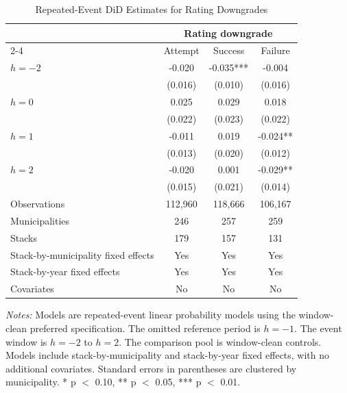 \begin{table}[!htbp]
\centering
\caption{Repeated-Event DiD Estimates for Rating Downgrades}
\label{tab:northeast_did_downgrade}
\small
\begin{tabular}{lccc}
\toprule
 & \multicolumn{3}{c}{Rating downgrade} \\
\cmidrule(lr){2-4}
 & Attempt & Success & Failure \\
\midrule
$h=-2$ & -0.020 & -0.035*** & -0.004 \\
 & (0.016) & (0.010) & (0.016) \\
$h=0$ & 0.025 & 0.029 & 0.018 \\
 & (0.022) & (0.023) & (0.022) \\
$h=1$ & -0.011 & 0.019 & -0.024** \\
 & (0.013) & (0.020) & (0.012) \\
$h=2$ & -0.020 & 0.001 & -0.029** \\
 & (0.015) & (0.021) & (0.014) \\
\midrule
Observations & 112,960 & 118,666 & 106,167 \\
Municipalities & 246 & 257 & 259 \\
Stacks & 179 & 157 & 131 \\
Stack-by-municipality fixed effects & Yes & Yes & Yes \\
Stack-by-year fixed effects & Yes & Yes & Yes \\
Covariates & No & No & No \\
\bottomrule
\end{tabular}
\vspace{0.05in}
\begin{minipage}{0.96\textwidth}\footnotesize\emph{Notes:} Models are repeated-event linear probability models using the window-clean preferred specification. The omitted reference period is $h=-1$. The event window is $h=-2$ to $h=2$. The comparison pool is window-clean controls. Models include stack-by-municipality and stack-by-year fixed effects, with no additional covariates. Standard errors in parentheses are clustered by municipality. * p $<$ 0.10, ** p $<$ 0.05, *** p $<$ 0.01.\end{minipage}
\end{table}
